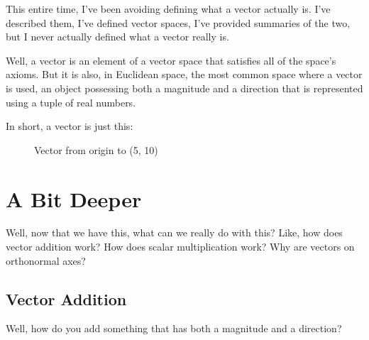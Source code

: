 \documentclass[12pt]{article}
\begin{document}
This entire time, I've been avoiding defining what a vector actually is. I've described them, I've defined vector spaces, I've provided summaries of the two, but I never actually defined what a vector really is.

Well, a vector is an element of a vector space that satisfies all of the space's axioms. But it is also, in Euclidean space, the most common space where a vector is used, an object possessing both a magnitude and a direction that is represented using a tuple of real numbers.

In short, a vector is just this:

\begin{figure}[H]
    \centering
    \caption{Vector from origin to (5, 10)}
\end{figure}

\section{A Bit Deeper}

Well, now that we have this, what can we really do with this? Like, how does vector addition work? How does scalar multiplication work? Why are vectors on orthonormal axes?

\subsection{Vector Addition}

Well, how do you add something that has both a magnitude and a direction?
\end{document}
